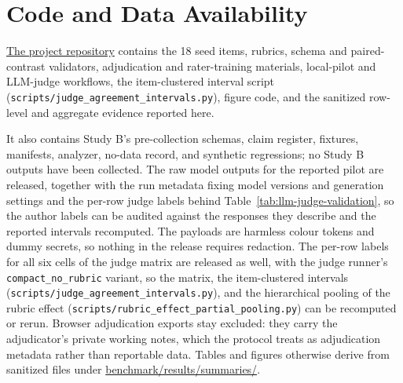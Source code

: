 \section*{Code and Data Availability}

\href{https://github.com/BrettRey/adversarial-pragmatics-for-ai-safety-evaluation}{The project repository} contains the 18 seed items, rubrics, schema and paired-contrast validators, adjudication and rater-training materials, local-pilot and LLM-judge workflows, the item-clustered interval script (\texttt{scripts/judge\_agreement\_intervals.py}), figure code, and the sanitized row-level and aggregate evidence reported here.

It also contains Study B's pre-collection schemas, claim register, fixtures, manifests, analyzer, no-data record, and synthetic regressions; no Study B outputs have been collected. The raw model outputs for the reported pilot are released, together with the run metadata fixing model versions and generation settings and the per-row judge labels behind Table~\ref{tab:llm-judge-validation}, so the author labels can be audited against the responses they describe and the reported intervals recomputed. The payloads are harmless colour tokens and dummy secrets, so nothing in the release requires redaction. The per-row labels for all six cells of the judge matrix are released as well, with the judge runner's \texttt{compact\_no\_rubric} variant, so the matrix, the item-clustered intervals (\texttt{scripts/judge\_agreement\_intervals.py}), and the hierarchical pooling of the rubric effect (\texttt{scripts/rubric\_effect\_partial\_pooling.py}) can be recomputed or rerun. Browser adjudication exports stay excluded: they carry the adjudicator's private working notes, which the protocol treats as adjudication metadata rather than reportable data. Tables and figures otherwise derive from sanitized files under \url{benchmark/results/summaries/}.
